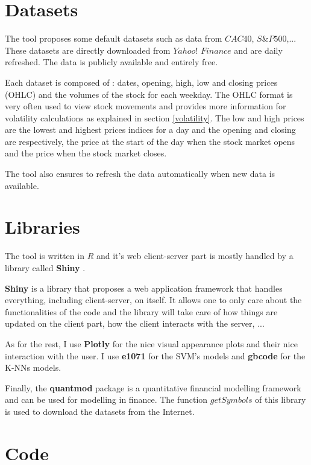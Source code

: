 \documentclass[11pt,a4paper,oneside]{book}
\begin{document}
\section{Datasets}\label{OHLC}

The tool proposes some default datasets such as data from $CAC40$, $S\&P 500$,... These datasets are directly downloaded from $Yahoo!$ $Finance$ and are daily refreshed. The data is publicly available and entirely free.

Each dataset is composed of : dates, opening, high, low and closing prices (OHLC) and the volumes of the stock for each weekday. The OHLC format is very often used to view stock movements and provides more information for volatility calculations as explained in section \ref{volatility}. The low and high prices are the lowest and highest prices indices for a day and the opening and closing are respectively, the price at the start of the day when the stock market opens and the price when the stock market closes.

The tool also ensures to refresh the data automatically when new data is available.



\section{Libraries}

The tool is written in \textbf{$R$} \cite{R} and it's web client-server part is mostly handled by a library called \textbf{Shiny} \cite{Shiny}.

\textbf{Shiny} is a library that proposes a web application framework that handles everything, including client-server, on itself. It allows one to only care about the functionalities of the code and the library will take care of how things are updated on the client part, how the client interacts with the server, ...

As for the rest, I use \textbf{Plotly} \cite{plotly} for the nice visual appearance plots and their nice interaction with the user. I use \textbf{e1071} \cite{e1071} for the SVM's models and \textbf{gbcode} \cite{gbcode} for the K-NNs models.

Finally, the \textbf{quantmod} \cite{quantmod} package is a quantitative financial modelling framework and can be used for modelling in finance. The function $getSymbols$ of this library is used to download the datasets from the Internet.


\section{Code}
\end{document}
